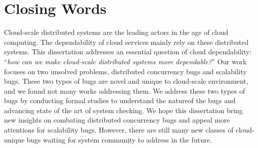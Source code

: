 \section{Closing Words}

Cloud-scale distributed systems are the leading actors in the age of cloud
computing. The dependability of cloud services mainly rely on these distributed
systems. This dissertation addresses an essential question of cloud
dependability: ``{\em how can we make cloud-scale distributed systems more
dependable?}'' Our work focuses on two unsolved problems, distributed
concurrency bugs and scalability bugs. These two types of bugs are novel and
unique to cloud-scale environment, and we found not many works addressing them.
We address these two types of bugs by conducting formal studies to understand
the natureof the bugs and advancing state of the art of system checking. We hope
this dissertation bring new insights on combating distributed concurrency bugs
and appeal more attentions for scalability bugs. However, there are still many
new classes of cloud-unique bugs waiting for system community to address in the
future.
